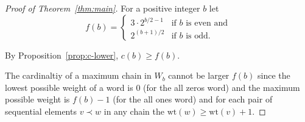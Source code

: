 \documentclass[12pt]{article}
\newcommand{\weight}[1]{\mathrm{wt}(#1)}
\begin{document}
\begin{proof}[Proof of Theorem~\ref{thm:main}]
  For a positive integer $b$ let
  \[
  f(b) =
  \begin{cases}
    3\cdot 2^{b/2-1} & \text{if $b$ is even and} \\
    2^{(b+1)/2} & \text{if $b$ is odd}.
  \end{cases}
  \]

  By Proposition~\ref{prop:c-lower}, $c(b)\ge f(b)$. 

  The cardinaltiy of a maximum chain in $W_b$ cannot be larger $f(b)$
  since the lowest possible weight of a word is $0$ (for the all zeros
  word) and the maximum possible weight is $f(b)-1$ (for the all ones
  word) and for each pair of sequential elements $v \prec w$ in any
  chain the $\weight{w}\ge\weight{v}+1$. 
\end{proof}
\end{document}
